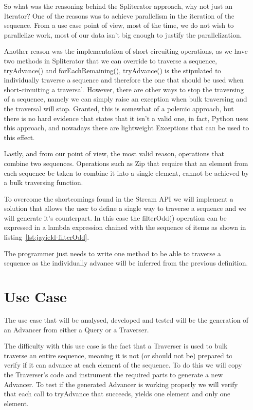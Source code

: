 So what was the reasoning behind the Spliterator approach, why not just an Iterator?
One of the reasons was to achieve parallelism in the iteration of the sequence. From a use case point of view, most of the time, we do not wish to parallelize work, most of our data isn't big enough to justify the parallelization.

Another reason was the implementation of short-circuiting operations, as we have two methods in Spliterator that we can override to traverse a sequence, tryAdvance() and forEachRemaining(), tryAdvance() is the stipulated to individually traverse a sequence and therefore the one that should be used when short-circuiting a traversal.
However, there are other ways to stop the traversing of a sequence, namely we can simply raise an exception when bulk traversing and the traversal will stop. Granted, this is somewhat of a polemic approach, but there is no hard evidence that states that it isn't a valid one, in fact, Python uses this approach, and nowadays there are lightweight Exceptions that can be used to this effect.

Lastly, and from our point of view, the most valid reason, operations that combine two sequences. Operations such as Zip that require that an element from each sequence be taken to combine it into a single element, cannot be achieved by a bulk traversing function.

To overcome the shortcomings found in the Stream API we will implement a solution that allows the user to define a single way to traverse a sequence and we will generate it's counterpart. In this case the filterOdd() operation can be expressed in a lambda expression chained with the sequence of items as shown in listing~\ref{lst:jayield-filterOdd}.



The programmer just needs to write one method to be able to traverse a sequence as the individually advance will be inferred from the previous definition.


\section{Use Case}
The use case that will be analysed, developed and tested will be the generation of an Advancer from either a Query or a Traverser.

The difficulty with this use case is the fact that a Traverser is used to bulk traverse an entire sequence, meaning it is not (or should not be) prepared to verify if it can advance at each element of the sequence. To do this we will copy the Traverser's code and instrument the required parts to generate a new Advancer. To test if the generated Advancer is working properly we will verify that each call to tryAdvance that succeeds, yields one element and only one element.
